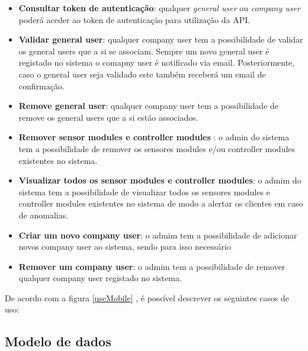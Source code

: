 \begin{itemize}
	\item \textbf{Consultar token de autenticação}: qualquer \textit{general user} ou \textit{company user} poderá aceder ao token de autenticação para utilização da API. 
	

	
	\item \textbf{Validar general user}: qualquer company user tem a possibilidade de validar os general users que a si se associam. Sempre um novo general user é registado no sistema o comapny user é notificado via email. Posteriormente, caso o general user seja validado este também receberá um email de confirmação.  
	
	\item \textbf{Remove general user}: qualquer company user tem a possibilidade de remove os general users que a si estão associados. 
	
	
	\item \textbf{Remover sensor modules e controller modules }: o admin do sistema tem a possibilidade de remover os sensores modules e/ou controller modules existentes no sistema. 
	
	
	\item \textbf{Visualizar todos os sensor modules e controller modules}: o admim do sistema tem a possibilidade de visualizar todos os sensores modules e controller modules existentes no sistema de modo a alertar os clientes em caso de anomalias. 
	
	
	\item \textbf{Criar um novo company user}: o admim tem a possibilidade de adicionar novos company user ao sistema, sendo para isso necessário 
	
	\item \textbf{Remover um company user}: o admim tem a possibilidade de remover qualquer company user registado no sistema.
	
	
\end{itemize}







De acordo com a figura \ref{useMobile} , é possível descrever os seguintes casos de uso: 






\newpage
\subsection{Modelo de dados}

